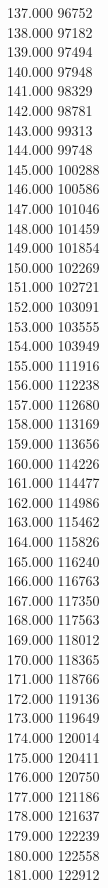 { 137.000	96752 \\
 138.000	97182 \\
 139.000	97494 \\
 140.000	97948 \\
 141.000	98329 \\
 142.000	98781 \\
 143.000	99313 \\
 144.000	99748 \\
 145.000	100288 \\
 146.000	100586 \\
 147.000	101046 \\
 148.000	101459 \\
 149.000	101854 \\
 150.000	102269 \\
 151.000	102721 \\
 152.000	103091 \\
 153.000	103555 \\
 154.000	103949 \\
 155.000	111916 \\
 156.000	112238 \\
 157.000	112680 \\
 158.000	113169 \\
 159.000	113656 \\
 160.000	114226 \\
 161.000	114477 \\
 162.000	114986 \\
 163.000	115462 \\
 164.000	115826 \\
 165.000	116240 \\
 166.000	116763 \\
 167.000	117350 \\
 168.000	117563 \\
 169.000	118012 \\
 170.000	118365 \\
 171.000	118766 \\
 172.000	119136 \\
 173.000	119649 \\
 174.000	120014 \\
 175.000	120411 \\
 176.000	120750 \\
 177.000	121186 \\
 178.000	121637 \\
 179.000	122239 \\
 180.000	122558 \\
 181.000	122912 \\
}

